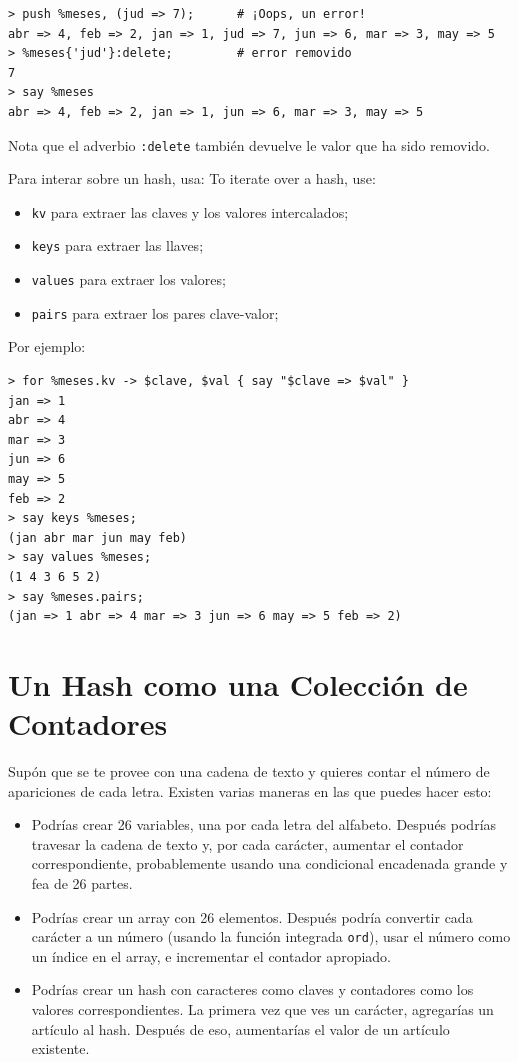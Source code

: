 \begin{verbatim}
> push %meses, (jud => 7);      # ¡Oops, un error!
abr => 4, feb => 2, jan => 1, jud => 7, jun => 6, mar => 3, may => 5
> %meses{'jud'}:delete;         # error removido
7
> say %meses
abr => 4, feb => 2, jan => 1, jun => 6, mar => 3, may => 5
\end{verbatim}

Nota que el adverbio {\tt :delete} también devuelve le valor que
ha sido removido.

Para interar sobre un hash, usa:
To iterate over a hash, use:

\begin{itemize}
\item {\tt kv} para extraer las claves y los valores intercalados;
\item {\tt keys} para extraer las llaves;
\item {\tt values} para extraer los valores;
\item {\tt pairs} para extraer los pares clave-valor;
\end{itemize}

Por ejemplo:

\begin{verbatim}
> for %meses.kv -> $clave, $val { say "$clave => $val" }
jan => 1
abr => 4
mar => 3
jun => 6
may => 5
feb => 2
> say keys %meses;
(jan abr mar jun may feb)
> say values %meses;
(1 4 3 6 5 2)
> say %meses.pairs;
(jan => 1 abr => 4 mar => 3 jun => 6 may => 5 feb => 2)
\end{verbatim}
%

\section{Un Hash como una Colección de Contadores}
\label{histogram}

Supón que se te provee con una cadena de texto y quieres contar
el número de apariciones de cada letra. Existen varias maneras
en las que puedes hacer esto:

\begin{itemize}

\item Podrías crear 26 variables, una por cada letra del 
alfabeto. Después podrías travesar la cadena de texto y, por cada
carácter, aumentar el contador correspondiente, probablemente
usando una condicional encadenada grande y fea de 26 partes.

\item Podrías crear un array con 26 elementos. Después podría
convertir cada carácter a un número (usando la función integrada
{\tt ord}), usar el número como un índice en el array, e 
incrementar el contador apropiado.

\item Podrías crear un hash con caracteres como claves y contadores
como los valores correspondientes. La primera vez que ves un carácter,
agregarías un artículo al hash. Después de eso, aumentarías el valor
de un artículo existente.
\end{itemize}

